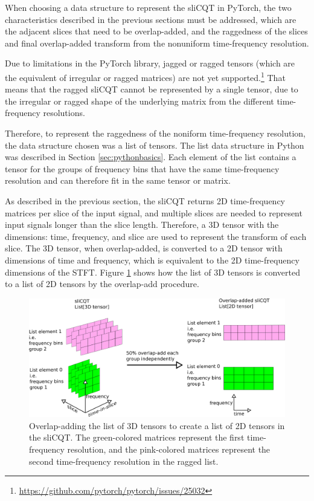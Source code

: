 \documentclass[report.tex]{subfiles}
\begin{document}
When choosing a data structure to represent the sliCQT in PyTorch, the two characteristics described in the previous sections must be addressed, which are the adjacent slices that need to be overlap-added, and the raggedness of the slices and final overlap-added transform from the nonuniform time-frequency resolution.

Due to limitations in the PyTorch library, jagged or ragged tensors (which are the equivalent of irregular or ragged matrices) are not yet supported.\footnote{\url{https://github.com/pytorch/pytorch/issues/25032}} That means that the ragged sliCQT cannot be represented by a single tensor, due to the irregular or ragged shape of the underlying matrix from the different time-frequency resolutions.

Therefore, to represent the raggedness of the noniform time-frequency resolution, the data structure chosen was a list of tensors. The list data structure in Python was described in Section \ref{sec:pythonbasics}. Each element of the list contains a tensor for the groups of frequency bins that have the same time-frequency resolution and can therefore fit in the same tensor or matrix.

As described in the previous section, the sliCQT returns 2D time-frequency matrices per slice of the input signal, and multiple slices are needed to represent input signals longer than the slice length. Therefore, a 3D tensor with the dimensions: time, frequency, and slice are used to represent the transform of each slice. The 3D tensor, when overlap-added, is converted to a 2D tensor with dimensions of time and frequency, which is equivalent to the 2D time-frequency dimensions of the STFT. Figure \ref{fig:3dslicqola2d} shows how the list of 3D tensors is converted to a list of 2D tensors by the overlap-add procedure.

\begin{figure}[ht]
	\centering
	\includegraphics[width=\textwidth]{./images-blockdiagrams/3dslicqola2d.png}
	\caption{Overlap-adding the list of 3D tensors to create a list of 2D tensors in the sliCQT. The green-colored matrices represent the first time-frequency resolution, and the pink-colored matrices represent the second time-frequency resolution in the ragged list.}
	\label{fig:3dslicqola2d}
\end{figure}
\end{document}

